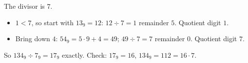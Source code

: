 The divisor is $7$.
\begin{itemize}
\item $1<7$, so start with $13_9=12$: $12\div7=1$ remainder $5$. Quotient digit $1$.
\item Bring down $4$: $54_9=5\cdot9+4=49$; $49\div7=7$ remainder $0$. Quotient digit $7$.
\end{itemize}
So $134_9\div7_9=\boxed{17_9}$ exactly. Check: $17_9=16$, $134_9=112=16\cdot7$.
